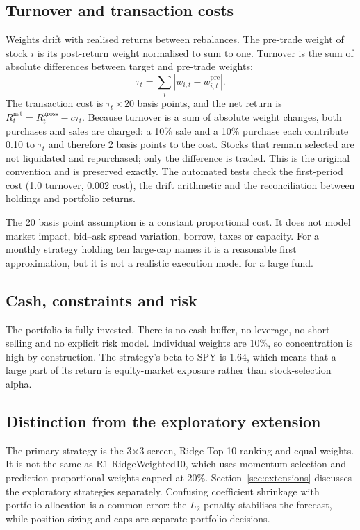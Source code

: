 \documentclass[11pt,a4paper]{article}
\begin{document}
\subsection{Turnover and transaction costs}

Weights drift with realised returns between rebalances. The pre-trade weight of stock $i$ is its post-return weight normalised to sum to one. Turnover is the sum of absolute differences between target and pre-trade weights:
\begin{equation}
\tau_t=\sum_i\left|w_{i,t}-w^{\text{pre}}_{i,t}\right|.
\label{eq:turnover}
\end{equation}
The transaction cost is $\tau_t\times 20$ basis points, and the net return is $R^{\text{net}}_t=R^{\text{gross}}_t-c\tau_t$. Because turnover is a sum of absolute weight changes, both purchases and sales are charged: a 10\% sale and a 10\% purchase each contribute 0.10 to $\tau_t$ and therefore 2 basis points to the cost. Stocks that remain selected are not liquidated and repurchased; only the difference is traded. This is the original convention and is preserved exactly. The automated tests check the first-period cost (1.0 turnover, 0.002 cost), the drift arithmetic and the reconciliation between holdings and portfolio returns.

The 20 basis point assumption is a constant proportional cost. It does not model market impact, bid--ask spread variation, borrow, taxes or capacity. For a monthly strategy holding ten large-cap names it is a reasonable first approximation, but it is not a realistic execution model for a large fund.

\subsection{Cash, constraints and risk}

The portfolio is fully invested. There is no cash buffer, no leverage, no short selling and no explicit risk model. Individual weights are 10\%, so concentration is high by construction. The strategy's beta to SPY is 1.64, which means that a large part of its return is equity-market exposure rather than stock-selection alpha.

\subsection{Distinction from the exploratory extension}

The primary strategy is the 3$\times$3 screen, Ridge Top-10 ranking and equal weights. It is not the same as R1 RidgeWeighted10, which uses momentum selection and prediction-proportional weights capped at 20\%. Section~\ref{sec:extensions} discusses the exploratory strategies separately. Confusing coefficient shrinkage with portfolio allocation is a common error: the $L_2$ penalty stabilises the forecast, while position sizing and caps are separate portfolio decisions.
\end{document}
